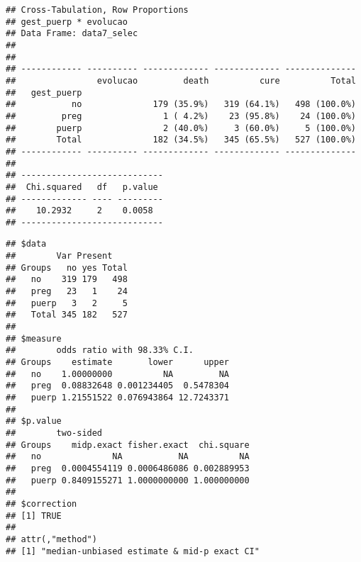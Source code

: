 \documentclass[
]{article}
\newenvironment{Shaded}{\begin{snugshade}}{\end{snugshade}}
\newcommand{\DataTypeTok}[1]{\textcolor[rgb]{0.13,0.29,0.53}{#1}}
\newcommand{\KeywordTok}[1]{\textcolor[rgb]{0.13,0.29,0.53}{\textbf{#1}}}
\newcommand{\NormalTok}[1]{#1}
\newcommand{\OperatorTok}[1]{\textcolor[rgb]{0.81,0.36,0.00}{\textbf{#1}}}
\newcommand{\OtherTok}[1]{\textcolor[rgb]{0.56,0.35,0.01}{#1}}
\newcommand{\StringTok}[1]{\textcolor[rgb]{0.31,0.60,0.02}{#1}}
\begin{document}
\begin{Shaded}
\end{Shaded}

\begin{verbatim}
## Cross-Tabulation, Row Proportions  
## gest_puerp * evolucao  
## Data Frame: data7_selec  
## 
## 
## ------------ ---------- ------------- ------------- --------------
##                evolucao         death          cure          Total
##   gest_puerp                                                      
##           no              179 (35.9%)   319 (64.1%)   498 (100.0%)
##         preg                1 ( 4.2%)    23 (95.8%)    24 (100.0%)
##        puerp                2 (40.0%)     3 (60.0%)     5 (100.0%)
##        Total              182 (34.5%)   345 (65.5%)   527 (100.0%)
## ------------ ---------- ------------- ------------- --------------
## 
## ----------------------------
##  Chi.squared   df   p.value 
## ------------- ---- ---------
##    10.2932     2    0.0058  
## ----------------------------
\end{verbatim}

\begin{Shaded}
\end{Shaded}

\begin{verbatim}
## $data
##        Var Present
## Groups   no yes Total
##   no    319 179   498
##   preg   23   1    24
##   puerp   3   2     5
##   Total 345 182   527
## 
## $measure
##        odds ratio with 98.33% C.I.
## Groups    estimate       lower      upper
##   no    1.00000000          NA         NA
##   preg  0.08832648 0.001234405  0.5478304
##   puerp 1.21551522 0.076943864 12.7243371
## 
## $p.value
##        two-sided
## Groups    midp.exact fisher.exact  chi.square
##   no              NA           NA          NA
##   preg  0.0004554119 0.0006486086 0.002889953
##   puerp 0.8409155271 1.0000000000 1.000000000
## 
## $correction
## [1] TRUE
## 
## attr(,"method")
## [1] "median-unbiased estimate & mid-p exact CI"
\end{verbatim}
\end{document}
